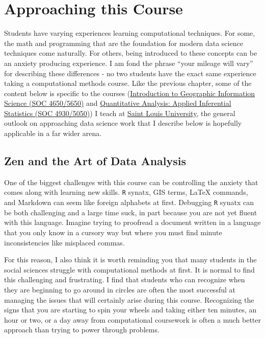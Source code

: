 \documentclass[]{book}
\theoremstyle{definition}
\theoremstyle{definition}
\theoremstyle{definition}
\theoremstyle{remark}
\begin{document}
\chapter{Approaching this Course}\label{approaching-this-course}

Students have varying experiences learning computational techniques. For
some, the math and programming that are the foundation for modern data
science techniques come naturally. For others, being introduced to these
concepts can be an anxiety producing experience. I am fond the phrase
``your mileage will vary'' for describing these differences - no two
students have the exact same experience taking a computational methods
course. Like the previous chapter, some of the content below is specific
to the courses (\href{https://slu-soc5650.github.io}{Introduction to
Geographic Information Science (SOC 4650/5650)} and
\href{https://slu-soc5050.github.io}{Quantitative Analysis: Applied
Inferential Statistics (SOC 4930/5050)}) I teach at
\href{https://slu.edu}{Saint Louis University}, the general outlook on
approaching data science work that I describe below is hopefully
applicable in a far wider arena.

\section{Zen and the Art of Data
Analysis}\label{zen-and-the-art-of-data-analysis}

One of the biggest challenges with this course can be controlling the
anxiety that comes along with learning new skills. \texttt{R} synatx,
GIS terms, LaTeX commands, and Markdown can seem like foreign alphabets
at first. Debugging \texttt{R} synatx can be both challenging and a
large time suck, in part because you are not yet fluent with this
language. Imagine trying to proofread a document written in a language
that you only know in a cursory way but where you must find minute
inconsistencies like misplaced commas.

For this reason, I also think it is worth reminding you that many
students in the social sciences struggle with computational methods at
first. It is normal to find this challenging and frustrating. I find
that students who can recognize when they are beginning to go around in
circles are often the most successful at managing the issues that will
certainly arise during this course. Recognizing the signs that you are
starting to spin your wheels and taking either ten minutes, an hour or
two, or a day away from computational coursework is often a much better
approach than trying to power through problems.
\end{document}
